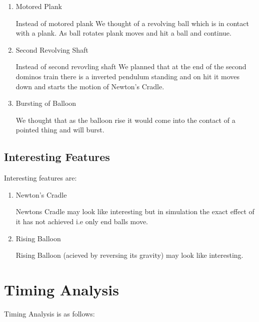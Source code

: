 \documentclass[a4paper,11pt]{article}
\begin{document}
\begin{enumerate}
\item {Motored Plank}
\begin{description} Instead of motored plank We thought of a revolving ball which is in contact with a plank. As ball rotates plank moves and hit a ball and continue.
\end{description}

\item {Second Revolving Shaft}
\begin{description} Instead of second revovling shaft We planned that at the end of the second dominos train there is a inverted pendulum standing and on hit it moves down and starts the motion of Newton's Cradle.
\end{description}

\item{Bursting of Balloon}
\begin{description} We thought that as the balloon rise it would come into the contact of a pointed thing and will burst.
\end{description}
\end{enumerate}

\subsection{Interesting Features}
Interesting features are:
\begin{enumerate}
\item {Newton's Cradle}
\begin{description} Newtons Cradle may look like interesting but in simulation the exact effect of it has not achieved i.e only end balls move.
\end{description}

\item {Rising Balloon}
\begin{description} Rising Balloon (acieved by reversing its gravity) may look like interesting.
\end{description}
\end{enumerate}


\section{Timing Analysis}
Timing Analysis is as follows:
\end{document}
